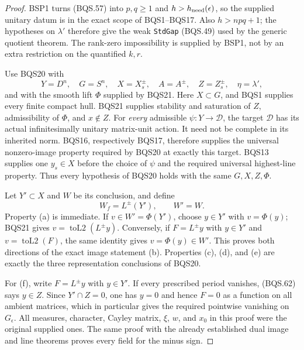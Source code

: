 \begin{proof}
BSP1 turns (BQS.57) into $p,q\ge1$ and
$h>h_{\rm need}(\epsilon)$, so the supplied unitary datum is in
the exact scope of BQS1--BQS17.
Also $h>npq+1$; the hypotheses on $\lambda'$ therefore give
the weak \texttt{StdGap} (BQS.49) used by the generic quotient
theorem.  The rank-zero impossibility is supplied by BSP1,
not by an extra restriction on the quantified $k,r$.

Use BQS20 with
\[
 Y=D^n,\quad G=S^n,\quad X=X_s^\pm,\quad
 A=A^\pm,\quad Z=Z_s^\pm,\quad \eta=\lambda',
 \tag{BQS.66}
\]
and with the smooth lift $\Phi$ supplied by BQS21.
Here $X\subset G$, and BQS1 supplies every finite compact hull.
BQS21 supplies stability and saturation of $Z$, admissibility
of $\Phi$, and $x\notin Z$.
For \emph{every} admissible $\psi:Y\to\mathcal D$, the target
$\mathcal D$ has its actual infinitesimally unitary matrix-unit
action.  It need not be complete in its inherited norm.
BQS16, respectively BQS17, therefore supplies the universal
nonzero-image property required by BQS20 at exactly this target.
BQS13 supplies one $y_s\in X$ before the choice of $\psi$ and
the required universal highest-line property.
Thus every hypothesis of BQS20 holds with the same $G,X,Z,\Phi$.

Let $Y'\subset X$ and $W$ be its conclusion, and define
\[
                         W_f=L^\pm(Y'),\qquad W'=W.
 \tag{BQS.67}
\]
Property (a) is immediate.
If $v\in W'=\Phi(Y')$, choose $y\in Y'$ with $v=\Phi(y)$;
BQS21 gives $v=\operatorname{toL2}(L^\pm y)$.
Conversely, if $F=L^\pm y$ with $y\in Y'$ and
$v=\operatorname{toL2}(F)$, the same identity gives $v=\Phi(y)\in W'$.
This proves both directions of the exact image statement (b).
Properties (c), (d), and (e) are exactly the three representation
conclusions of BQS20.

For (f), write $F=L^\pm y$ with $y\in Y'$.
If every prescribed period vanishes, (BQS.62) says $y\in Z$.
Since $Y'\cap Z=0$, one has $y=0$ and hence $F=0$ as a function
on all ambient matrices, which in particular gives the required
pointwise vanishing on $G_\epsilon$.
All measures, character, Cayley matrix, $\xi$, $w$, and $x_0$
in this proof were the original supplied ones.
The same proof with the already established dual image and
line theorems proves every field for the minus sign.
\end{proof}

